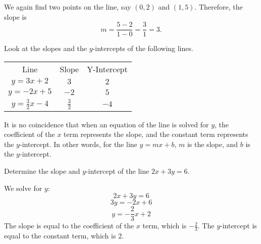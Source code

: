 \begin{solution} We again find two points on the line, say $(0, 2)$ and $(1, 5)$.
Therefore, the slope is
\[ m = \frac{5 - 2}{1 - 0} = \frac{3}{1} = 3.\]
\end{solution}
Look at the slopes and the $y$-intercepts of the following lines.
\begin{center}

\begin{tabular}{ccc}
Line & Slope & Y-Intercept \\
$y = 3x + 2$ & $3$ & $2$ \\
$y = -2x + 5$ & $-2$ & $5$ \\
$y = \frac{3}{2}x - 4$ & $\frac{3}{2}$ & $-4$
\end{tabular}
\end{center}

It is no coincidence that when an equation of the line is solved for $y$, the coefficient of the $x$ term represents the slope, and the constant term represents the $y$-intercept.
In other words, for the line $y = mx + b$, $m$ is the slope, and $b$ is the $y$-intercept.

\begin{example}
Determine the slope and $y$-intercept of the line $2x + 3y = 6$.
\end{example}

\begin{solution}
We solve for $y$:
\[2x + 3y = 6\]
\[3y = -2x + 6\]
\[y = -\frac{2}{3}x + 2\]
The slope is equal to the coefficient of the $x$ term, which is $-\frac{2}{3}$.
The $y$-intercept is equal to the constant term, which is $2$.
\end{solution}
